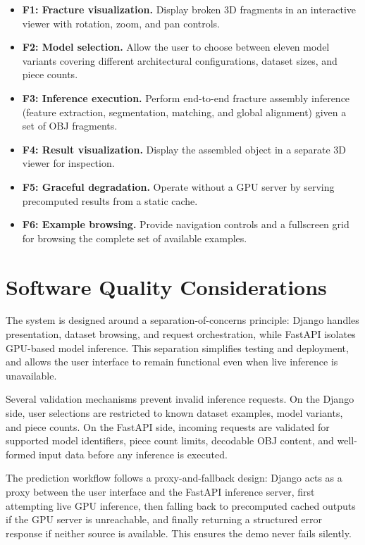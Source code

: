 \begin{itemize}
    \item \textbf{F1: Fracture visualization.} Display broken 3D fragments in an interactive viewer with rotation, zoom, and pan controls.
    \item \textbf{F2: Model selection.} Allow the user to choose between eleven model variants covering different architectural configurations, dataset sizes, and piece counts.
    \item \textbf{F3: Inference execution.} Perform end-to-end fracture assembly inference (feature extraction, segmentation, matching, and global alignment) given a set of OBJ fragments.
    \item \textbf{F4: Result visualization.} Display the assembled object in a separate 3D viewer for inspection.
    \item \textbf{F5: Graceful degradation.} Operate without a GPU server by serving precomputed results from a static cache.
    \item \textbf{F6: Example browsing.} Provide navigation controls and a fullscreen grid for browsing the complete set of available examples.
\end{itemize}

\section{Software Quality Considerations}

The system is designed around a separation-of-concerns principle: Django handles presentation, dataset browsing, and request orchestration, while FastAPI isolates GPU-based model inference. This separation simplifies testing and deployment, and allows the user interface to remain functional even when live inference is unavailable.

Several validation mechanisms prevent invalid inference requests. On the Django side, user selections are restricted to known dataset examples, model variants, and piece counts. On the FastAPI side, incoming requests are validated for supported model identifiers, piece count limits, decodable OBJ content, and well-formed input data before any inference is executed.

The prediction workflow follows a proxy-and-fallback design: Django acts as a proxy between the user interface and the FastAPI inference server, first attempting live GPU inference, then falling back to precomputed cached outputs if the GPU server is unreachable, and finally returning a structured error response if neither source is available. This ensures the demo never fails silently.

